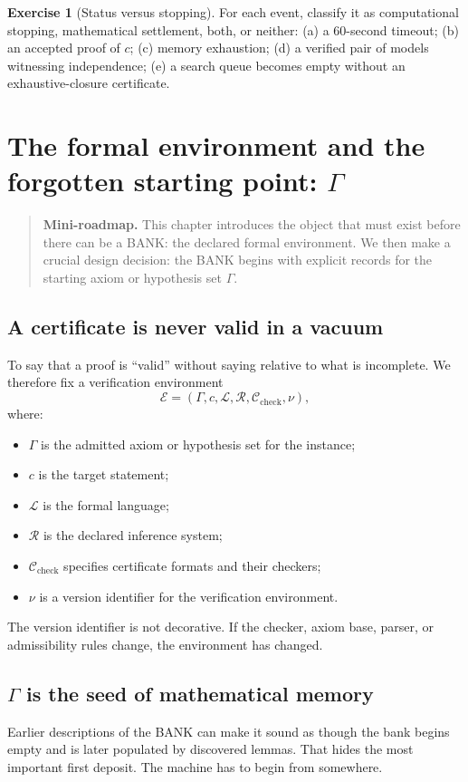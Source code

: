 \documentclass[11pt,openany]{book}
\theoremstyle{definition}
\newtheorem{exercise}[theorem]{Exercise}
\theoremstyle{remark}
\newenvironment{miniroadmap}{\begin{quote}\small\color{deepblue}\textbf{Mini-roadmap.} }{\end{quote}}
\newcommand{\Env}{\mathcal{E}}
\begin{document}
\begin{exercise}[Status versus stopping]\label{ex:stop}
For each event, classify it as computational stopping, mathematical settlement, both, or neither: (a) a 60-second timeout; (b) an accepted proof of $c$; (c) memory exhaustion; (d) a verified pair of models witnessing independence; (e) a search queue becomes empty without an exhaustive-closure certificate.
\end{exercise}

\chapter{The formal environment and the forgotten starting point: \texorpdfstring{$\Gamma$}{Gamma}}
\begin{miniroadmap}
This chapter introduces the object that must exist before there can be a BANK: the declared formal environment. We then make a crucial design decision: the BANK begins with explicit records for the starting axiom or hypothesis set $\Gamma$.
\end{miniroadmap}

\section{A certificate is never valid in a vacuum}
To say that a proof is ``valid'' without saying relative to what is incomplete. We therefore fix a verification environment
\[
\Env=(\Gamma,c,\mathcal L,\mathcal R,\mathcal C_{\mathrm{check}},\nu),
\]
where:
\begin{itemize}
\item $\Gamma$ is the admitted axiom or hypothesis set for the instance;
\item $c$ is the target statement;
\item $\mathcal L$ is the formal language;
\item $\mathcal R$ is the declared inference system;
\item $\mathcal C_{\mathrm{check}}$ specifies certificate formats and their checkers;
\item $\nu$ is a version identifier for the verification environment.
\end{itemize}
The version identifier is not decorative. If the checker, axiom base, parser, or admissibility rules change, the environment has changed.

\section{\texorpdfstring{$\Gamma$}{Gamma} is the seed of mathematical memory}
Earlier descriptions of the BANK can make it sound as though the bank begins empty and is later populated by discovered lemmas. That hides the most important first deposit. The machine has to begin from somewhere.
\end{document}
